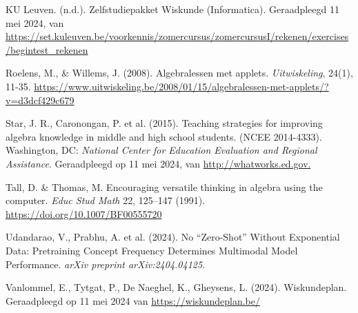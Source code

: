 \begin{bronnen}
    \item KU Leuven. (n.d.). Zelfstudiepakket Wiskunde (Informatica). Geraadpleegd 11 mei 2024, van \url{https://set.kuleuven.be/voorkennis/zomercursus/zomercursusI/rekenen/exercises/begintest_rekenen}
    \item Roelens, M., \& Willems, J. (2008). Algebralessen met applets. \textit{Uitwiskeling}, 24(1), 11-35. \url{https://www.uitwiskeling.be/2008/01/15/algebralessen-met-applets/?v=d3dcf429c679}
    \item Star, J. R., Caronongan, P. et al. (2015). Teaching strategies for improving algebra knowledge in middle and high school students. (NCEE 2014-4333). Washington, DC: \emph{National Center for Education Evaluation and Regional Assistance}. Geraadpleegd op 11 mei 2024, van \url{http://whatworks.ed.gov.}
    \item Tall, D. \& Thomas, M. Encouraging versatile thinking in algebra using the computer. \textit{Educ Stud Math} 22, 125–147 (1991). \url{https://doi.org/10.1007/BF00555720}
    \item Udandarao, V., Prabhu, A. et al. (2024). No ``Zero-Shot'' Without Exponential Data: Pretraining Concept Frequency Determines Multimodal Model Performance. \textit{arXiv preprint arXiv:2404.04125}.
    \item Vanlommel, E., Tytgat, P., De Naeghel, K., Gheysens, L. (2024). Wiskundeplan. Geraadpleegd op 11 mei 2024 van \url{https://wiskundeplan.be/}
\end{bronnen}
